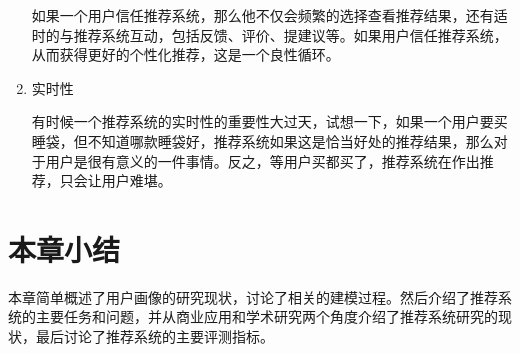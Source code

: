 \begin{enumerate}[(1)]
			如果一个用户信任推荐系统，那么他不仅会频繁的选择查看推荐结果，还有适时的与推荐系统互动，包括反馈、评价、提建议等。如果用户信任推荐系统，从而获得更好的个性化推荐，这是一个良性循环。
			\item 实时性

			有时候一个推荐系统的实时性的重要性大过天\citep{temporal-cf}，试想一下，如果一个用户要买睡袋，但不知道哪款睡袋好，推荐系统如果这是恰当好处的推荐结果，那么对于用户是很有意义的一件事情。反之，等用户买都买了，推荐系统在作出推荐，只会让用户难堪。
			\end{enumerate}

	\section{本章小结}
	本章简单概述了用户画像的研究现状，讨论了相关的建模过程。然后介绍了推荐系统的主要任务和问题，并从商业应用和学术研究两个角度介绍了推荐系统研究的现状，最后讨论了推荐系统的主要评测指标。